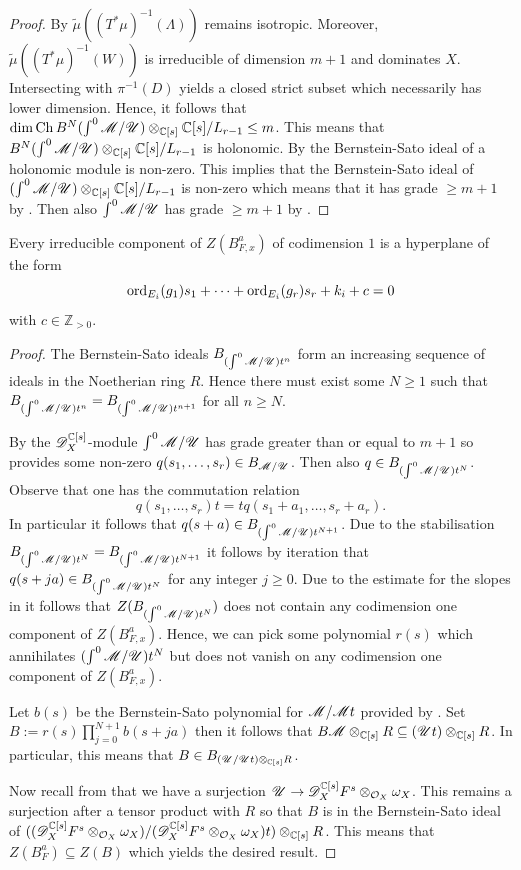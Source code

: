 \begin{proof}
  By \cite[Proposition 4.9]{kashiwara1976b} $\widetilde{\mu}((T^*\mu)^{-1}(\Lambda))$ remains isotropic.
  Moreover, $\widetilde{\mu}((T^*\mu)^{-1}(W))$ is irreducible of dimension $m+1$ and dominates $X$.
  Intersecting with $\pi^{-1}(D)$ yields a closed strict subset which necessarily has lower dimension.
  Hence, it follows that $\dim \operatorname{Ch} B^N (\int^0\mathscr{M}/\allowbreak \mathscr{U})\otimes_{\mathbb{C}[s]}\mathbb{C}[s]/L_{r-1} \leq m$.
  This means that $B^N(\int^0\mathscr{M}/ \mathscr{U})\otimes_{\mathbb{C}[s]}\mathbb{C}[s]/L_{r-1}$ is holonomic.
  By \cite[Proposition 3.11, Chapter 3]{bjork1979rings} the Bernstein-Sato ideal of a holonomic module is non-zero.
  This implies that the Bernstein-Sato ideal of $(\int^0\mathscr{M}/ \mathscr{U})\otimes_{\mathbb{C}[s]}\mathbb{C}[s]/L_{r-1}$ is non-zero which means that it has grade $\geq m+1$ by .
  Then also $\int^0\mathscr{M}/\mathscr{U}$ has grade $\geq m+1$ by .
  \end{proof}
  \begin{theorem}\label{thm: EstimateBernsteinSatoZeroLocust}
  Every irreducible component of $Z(B_{F,x}^a)$ of codimension $1$ is a hyperplane of the form
  $$\operatorname{ord}_{E_i}(g_1) s_1 + \cdots + \operatorname{ord}_{E_i}(g_r)s_r + k_i + c=0$$
  with $c \in \mathbb{Z}_{> 0 }$.
\end{theorem}
\begin{proof}
  The Bernstein-Sato ideals $B_{(\int^0\mathscr{M}/\mathscr{U})t^n}$ form an increasing sequence of ideals in the Noetherian ring $R$.
  Hence there must exist some $N\geq 1$ such that $B_{(\int^0\mathscr{M}/\mathscr{U})t^n} = B_{(\int^0\mathscr{M}/\mathscr{U})t^{n+1}}$ for all $n\geq N$.

  By  the $\mathscr{D}_X^{\mathbb{C}[s]}$-module $\int^0\mathscr{M}/\mathscr{U}$ has grade greater than or equal to $m + 1$ so  provides some non-zero $q(s_1,\ldots,s_r) \in B_{\mathscr{M}/\mathscr{U}}$.
	Then also $q\in B_{(\int^0\mathscr{M}/\mathscr{U})t^N}$.
  Observe that one has the commutation relation
  $$q(s_1,\ldots,s_r)t = tq(s_1+a_1,\ldots, s_r + a_r).$$
  In particular it follows that $q(s + a)\in B_{(\int^0\mathscr{M}/\mathscr{U})t^{N+1}}$.
  Due to the stabilisation $B_{(\int^0\mathscr{M}/\mathscr{U})t^N} = B_{(\int^0\mathscr{M}/\mathscr{U})t^{N+1}}$ it follows by iteration that $q(s+ja)\in B_{(\int^0\mathscr{M}/\mathscr{U})t^N}$ for any integer $j\geq 0$.
  Due to the estimate for the slopes in  it follows that $Z(B_{(\int^0\mathscr{M}/\mathscr{U})t^N})$ does not contain any codimension one component of $Z(B_{F,x}^a)$.
  Hence, we can pick some polynomial $r(s)$ which annihilates $(\int^0\mathscr{M}/\mathscr{U})t^N$ but does not vanish on any codimension one component of $Z(B_{F,x}^a)$.

  Let $b(s)$ be the Bernstein-Sato polynomial for $\mathscr{M}/\mathscr{M} t$ provided by .
  Set $B := r(s)\prod_{j=0}^{N+1} b(s+ ja)$ then it follows that
  $B\mathscr{M}\otimes_{\mathbb{C}[s]}R \subseteq (\mathscr{U} t)\otimes_{\mathbb{C}[s]}R$.
  In particular, this means that $B\in B_{(\mathscr{U}/\mathscr{U} t)\otimes_{\mathbb{C}[s]}R}$.

	Now recall from  that we have a surjection $\mathscr{U} \to \mathscr{D}_X^{\mathbb{C}[s]}F^s \otimes_{\mathcal{O}_X}\omega_X$.
	This remains a surjection after a tensor product with $R$ so that $B$ is in the Bernstein-Sato ideal of $((\mathscr{D}_X^{\mathbb{C}[s]}F^s \otimes_{\mathcal{O}_X}\omega_X)/(\mathscr{D}_X^{\mathbb{C}[s]}F^s \otimes_{\mathcal{O}_X}\omega_X)t ) \otimes_{\mathbb{C}[s]}R$.
	This means that $Z(B_F^a)\subseteq Z(B)$ which yields the desired result.
\end{proof}
